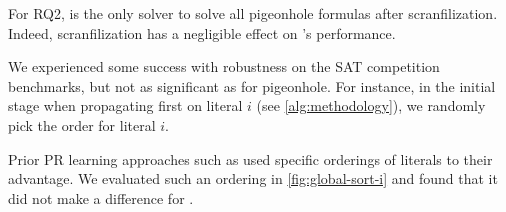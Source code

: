  
For RQ2, \tool is the only solver to solve all pigeonhole formulas after
scranfilization. Indeed, scranfilization has a negligible effect on \tool's
performance.

We experienced some success with robustness on the SAT competition benchmarks,
but not as significant as for pigeonhole. For instance, in the initial stage
when propagating first on literal $i$ (see \autoref{alg:methodology}), we
randomly pick the order for literal $i$.

Prior PR learning approaches such as \prelearn used specific orderings of
literals to their advantage. We evaluated such an ordering in
\autoref{fig:global-sort-i} and found that it did not make a difference for
\tool.

